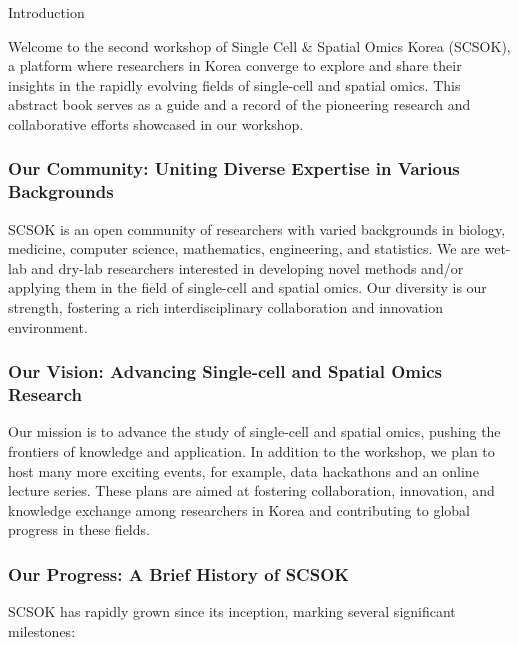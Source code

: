 \begin{coverpage}{Introduction}
{
Welcome to the second workshop of Single Cell \& Spatial Omics Korea (SCSOK), a platform where researchers in Korea converge to explore and share their insights in the rapidly evolving fields of single-cell and spatial omics. This abstract book serves as a guide and a record of the pioneering research and collaborative efforts showcased in our workshop.

\subsubsection*{Our Community: Uniting Diverse Expertise in Various Backgrounds}
SCSOK is an open community of researchers with varied backgrounds in biology, medicine, computer science, mathematics, engineering, and statistics. We are wet-lab and dry-lab researchers interested in developing novel methods and/or applying them in the field of single-cell and spatial omics. Our diversity is our strength, fostering a rich interdisciplinary collaboration and innovation environment.

\subsubsection*{Our Vision: Advancing Single-cell and Spatial Omics Research}
Our mission is to advance the study of single-cell and spatial omics, pushing the frontiers of knowledge and application. In addition to the workshop, we plan to host many more exciting events, for example, data hackathons and an online lecture series. These plans are aimed at fostering collaboration, innovation, and knowledge exchange among researchers in Korea and contributing to global progress in these fields.

\subsubsection*{Our Progress: A Brief History of SCSOK}
SCSOK has rapidly grown since its inception, marking several significant milestones:

}
\end{coverpage}
